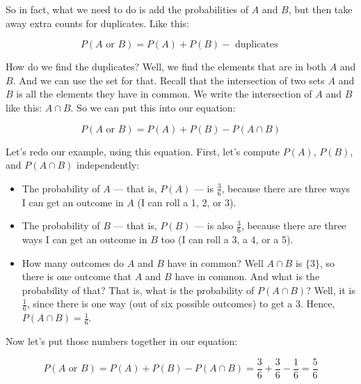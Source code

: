 \documentclass[../../../main.tex]{subfiles}
\begin{document}
So in fact, what we need to do is add the probabilities of $A$ and $B$, but then take away extra counts for duplicates. Like this:

\begin{equation*}
  P(A \text{ or } B) = P(A) + P(B) - \text{ duplicates }
\end{equation*}

\noindent
How do we find the duplicates? Well, we find the elements that are in both $A$ and $B$. And we can use the set  for that. Recall that the intersection of two sets $A$ and $B$ is all the elements they have in common. We write the intersection of $A$ and $B$ like this: $A \cap B$. So we can put this into our equation:

\begin{equation*}
  P(A \text{ or } B) = P(A) + P(B) - P(A \cap B)
\end{equation*}

\noindent
Let's redo our example, using this equation. First, let's compute $P(A)$, $P(B)$, and $P(A \cap B)$ independently:

\begin{itemize}

  \item The probability of $A$ --- that is, $P(A)$ --- is $\frac{3}{6}$, because there are three ways I can get an outcome in $A$ (I can roll a 1, 2, or 3).
  
  \item The probability of $B$  --- that is, $P(B)$ --- is also $\frac{3}{6}$, because there are three ways I can get an outcome in $B$ too (I can roll a 3, a 4, or a 5).
  
  \item How many outcomes do $A$ and $B$ have in common? Well $A \cap B$ is $\{ 3 \}$, so there is one outcome that $A$ and $B$ have in common. And what is the probability of that? That is, what is the probability of $P(A \cap B)$? Well, it is $\frac{1}{6}$, since there is one way (out of six possible outcomes) to get a 3. Hence, $P(A \cap B) = \frac{1}{6}$.
  
\end{itemize} 

\noindent
Now let's put those numbers together in our equation:

\begin{equation*}
  P(A \text{ or } B) = P(A) + P(B) - P(A \cap B) = \frac{3}{6} + \frac{3}{6} - \frac{1}{6} = \frac{5}{6}
\end{equation*}
\end{document}
